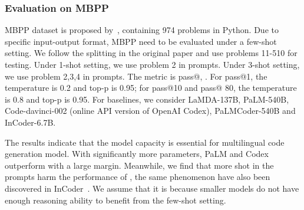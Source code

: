 \subsubsection{Evaluation on MBPP}

MBPP dataset is proposed by~\cite{austin2021program}, containing 974 problems in Python. 
Due to specific input-output format, MBPP need to be evaluated under a few-shot setting.
We follow the splitting in the original paper and use problems 11-510 for testing.
Under 1-shot setting, we use problem 2 in prompts.
Under 3-shot setting, we use problem 2,3,4 in prompts.
The metric is pass@, .
For pass@1, the temperature is 0.2 and top-p is 0.95; for pass@10 and pass@ 80, the temperature is 0.8 and top-p is 0.95.
For baselines, we consider LaMDA-137B, PaLM-540B, Code-davinci-002 (online API version of OpenAI Codex), PaLMCoder-540B and InCoder-6.7B.

The results indicate that the model capacity is essential for multilingual code generation model.
With significantly more parameters, PaLM and Codex outperform \name with a large margin.
Meanwhile, we find that more shot in the prompts harm the performance of \name, the same phenomenon have also been discovered in InCoder~\citep{fried2022incoder}.
We assume that it is because smaller models do not have enough reasoning ability to benefit from the few-shot setting.

\begin{table}
\centering
\caption{The results of \name on MBPP dataset~\citep{austin2021program}. }
\label{tab:app_mbpp}
\end{table}

